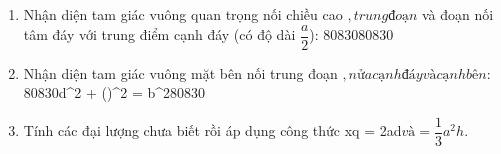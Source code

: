 \begin{enumerate}
\item Nhận diện tam giác vuông quan trọng nối chiều cao $, trung đoạn $ và đoạn nối tâm đáy với trung điểm cạnh đáy (có độ dài $\dfrac{a}{2}$):
8083080830
\item Nhận diện tam giác vuông mặt bên nối trung đoạn $, nửa cạnh đáy $$ và cạnh bên $:
80830d^2 + \left(\right)^2 = b^280830
\item Tính các đại lượng chưa biết rồi áp dụng công thức {xq} = 2ad$ và  = \dfrac{1}{3}a^2 h$.
\end{enumerate}
